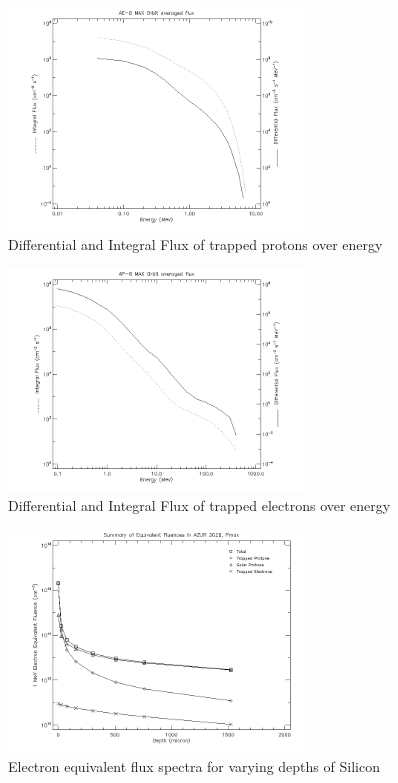 \begin{figure}[h!]
\centering
\includegraphics[width=0.7\textwidth]{figures/fluxElectrons.png}
\caption{Differential and Integral Flux of trapped protons over energy}
\label{FluxE}
\end{figure}

\begin{figure}[h!]
\centering
\includegraphics[width=0.7\textwidth]{figures/fluxProtons.png}
\caption{Differential and Integral Flux of trapped electrons over energy}
\label{FluxP}
\end{figure}

\begin{figure}[h!]
\centering
\includegraphics[width=0.7\textwidth]{figures/eqfluxsp.png}
\caption{Electron equivalent flux spectra for varying depths of Silicon}
\label{eqflux}
\end{figure}




